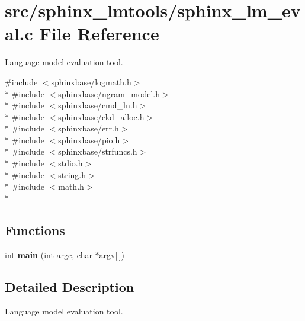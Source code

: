 \section{src/sphinx\+\_\+lmtools/sphinx\+\_\+lm\+\_\+eval.c File Reference}
\label{sphinx__lm__eval_8c}


Language model evaluation tool.  


{\ttfamily \#include $<$sphinxbase/logmath.\+h$>$}\\*
{\ttfamily \#include $<$sphinxbase/ngram\+\_\+model.\+h$>$}\\*
{\ttfamily \#include $<$sphinxbase/cmd\+\_\+ln.\+h$>$}\\*
{\ttfamily \#include $<$sphinxbase/ckd\+\_\+alloc.\+h$>$}\\*
{\ttfamily \#include $<$sphinxbase/err.\+h$>$}\\*
{\ttfamily \#include $<$sphinxbase/pio.\+h$>$}\\*
{\ttfamily \#include $<$sphinxbase/strfuncs.\+h$>$}\\*
{\ttfamily \#include $<$stdio.\+h$>$}\\*
{\ttfamily \#include $<$string.\+h$>$}\\*
{\ttfamily \#include $<$math.\+h$>$}\\*
\subsection*{Functions}
\begin{DoxyCompactItemize}
\item 
int {\bfseries main} (int argc, char $\ast$argv[$\,$])\label{sphinx__lm__eval_8c_a0ddf1224851353fc92bfbff6f499fa97}

\end{DoxyCompactItemize}


\subsection{Detailed Description}
Language model evaluation tool. 

